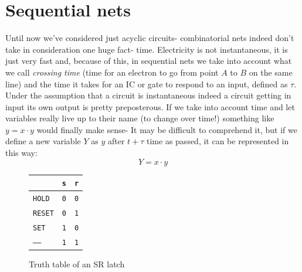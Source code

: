 \documentclass{scrartcl}
\newcommand{\zero}{\texttt{0}}
\newcommand{\one}{\texttt{1}}
\begin{document}
    \section{Sequential nets}
    Until now we've considered just acyclic circuits- combinatorial nets indeed don't take in consideration one huge fact- time. Electricity is not instantaneous, it is just very fast and, because of this, in sequential nets we take into account what we call \emph{crossing time} (time for an electron to go from point $A$ to $B$ on the same line) and the time it takes for an IC or gate to respond to an input, defined as $\tau$.
    Under the assumption that a circuit is instantaneous indeed a circuit getting in input its own output is pretty preposterous.
    If we take into account time and let variables really live up to their name (to change over time!) something like $y = x \cdot y$ would finally make sense- It may be difficult to comprehend it, but if we define a new variable $Y$ as $y$ after $t+\tau$ time as passed, it can be represented in this way:
    \begin{equation*}
        Y= x\cdot y
    \end{equation*}
    \begin{figure}
        \centering
        \begin{tabular}{| l | c | c |}
            \hline
            & \texttt{s} & \texttt{r} \\\hline
            \texttt{HOLD} & \zero & \zero\\
            \texttt{RESET} & \zero & \one\\
            \texttt{SET} & \one & \zero\\
            \texttt{-----} & \one & \one\\\hline
        \end{tabular}
        \caption{Truth table of an SR latch}
    \end{figure}
    \vspace{-1cm}
\end{document}
